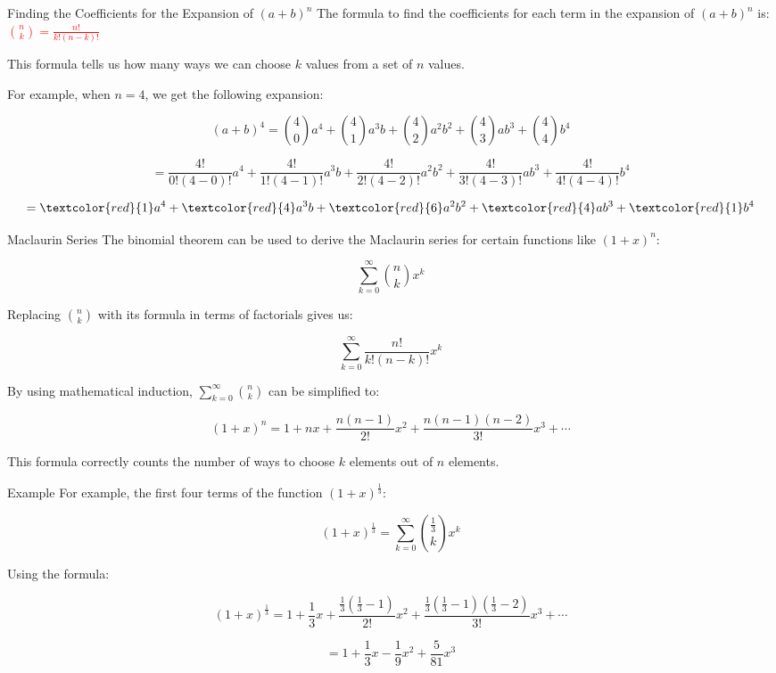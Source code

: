 \documentclass{beamer}
\theoremstyle{plain}
\theoremstyle{definition}
\theoremstyle{remark}
\begin{document}
\begin{frame}{Finding the Coefficients for the Expansion of \((a+b)^n\)}
The formula to find the coefficients for each term in the expansion of \((a+b)^n\) is: \textcolor{red}{$\binom{n}{k} = \frac{n!}{k!(n-k)!}$}

\vspace{0.3cm}
This formula tells us how many ways we can choose \(k\) values from a set of \(n\) values.

\vspace{0.3cm}
For example, when \(n = 4\), we get the following expansion:

\vspace{0.1cm}
$$(a+b)^4 = \binom{4}{0}a^4 + \binom{4}{1}a^3b + \binom{4}{2}a^2b^2 + \binom{4}{3}ab^3 + \binom{4}{4}b^4$$

\vspace{0.3cm}
$$= \frac{4!}{0!(4-0)!} a^4 + \frac{4!}{1!(4-1)!} a^3 b + \frac{4!}{2!(4-2)!} a^2 b^2 + \frac{4!}{3!(4-3)!} ab^3 + \frac{4!}{4!(4-4)!} b^4$$

\vspace{0.3cm}
$$= \textcolor{red}{1} a^4 + \textcolor{red}{4} a^3 b + \textcolor{red}{6} a^2 b^2 + \textcolor{red}{4} ab^3 + \textcolor{red}{1} b^4$$
\end{frame}

\begin{frame}{Maclaurin Series}
The binomial theorem can be used to derive the Maclaurin series for certain functions like \((1+x)^n\):

$$\sum_{k=0}^{\infty} \binom{n}{k} x^k$$

Replacing \(\binom{n}{k}\) with its formula in terms of factorials gives us:

$$\sum_{k=0}^{\infty} \frac{n!}{k!(n-k)!} x^k$$

By using mathematical induction, \(\sum_{k=0}^{\infty} \binom{n}{k}\) can be simplified to:

$$(1+x)^n = 1 + nx + \frac{n(n-1)}{2!}x^2 + \frac{n(n-1)(n-2)}{3!}x^3 + \cdots$$

This formula correctly counts the number of ways to choose \(k\) elements out of \(n\) elements.
\end{frame}

\begin{frame}{Example}
For example, the first four terms of the function \((1+x)^{\frac{1}{3}}\):

\vspace{0.2cm}
$$(1+x)^{\frac{1}{3}} = \sum_{k=0}^{\infty} \binom{\frac{1}{3}}{k} x^k$$

\vspace{0.2cm}
Using the formula:

$$(1+x)^{\frac{1}{3}} = 1 + \frac{1}{3}x + \frac{\frac{1}{3}(\frac{1}{3}-1)}{2!}x^2 + \frac{\frac{1}{3}(\frac{1}{3}-1)(\frac{1}{3}-2)}{3!}x^3 + \cdots$$

\vspace{0.2cm}
$$= 1 + \frac{1}{3}x - \frac{1}{9}x^2 + \frac{5}{81}x^3$$
\end{frame}
\end{document}
